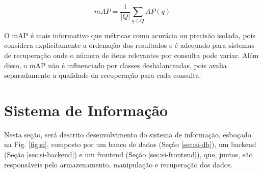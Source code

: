 \begin{equation}\label{eq:map}
  mAP = \frac{1}{|Q|} \sum_{q \in Q} AP(q)
\end{equation}

O mAP é mais informativo que métricas como acurácia ou precisão isolada, pois considera explicitamente a ordenação dos resultados e é adequado para sistemas de recuperação onde o número de itens relevantes por consulta pode variar. Além disso, o mAP não é influenciado por classes desbalanceadas, pois avalia separadamente a qualidade da recuperação para cada consulta.





\section{Sistema de Informação}
\label{sec:si}


Nesta seção, será descrito desenvolvimento do sistema de informação, esboçado na Fig. \ref{fig:si}, composto por um banco de dados (Seção \ref{sec:si-db}), um backend (Seção \ref{sec:si-backend}) e um frontend (Seção \ref{sec:si-frontend}), que, juntos, são responsáveis pelo armazenamento, manipulação e recuperação dos dados.

